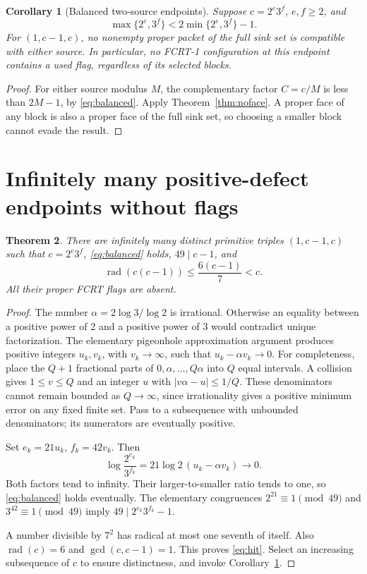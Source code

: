 \documentclass[11pt]{article}
\newtheorem{theorem}{Theorem}[section]
\newtheorem{corollary}[theorem]{Corollary}
\theoremstyle{definition}\newtheorem{definition}[theorem]{Definition}
\theoremstyle{remark}\newtheorem{remark}[theorem]{Remark}
\newcommand{\rad}{\operatorname{rad}}
\begin{document}
\begin{corollary}[Balanced two-source endpoints]\label{cor:balanced}
Suppose \(c=2^e3^f\), \(e,f\ge2\), and
\begin{equation}\label{eq:balanced}
 \max\{2^e,3^f\}<2\min\{2^e,3^f\}-1.
\end{equation}
For \((1,c-1,c)\), no nonempty proper packet of the full sink set is
compatible with either source. In particular, \emph{no} FCRT-1 configuration
at this endpoint contains a used flag, regardless of its selected blocks.
\end{corollary}
\begin{proof}
For either source modulus \(M\), the complementary factor \(C=c/M\)
is less than \(2M-1\), by \eqref{eq:balanced}. Apply
Theorem~\ref{thm:noface}. A proper face of any block is also a proper face
of the full sink set, so choosing a smaller block cannot evade the result.
\end{proof}

\section{Infinitely many positive-defect endpoints without flags}
\begin{theorem}\label{thm:infinite}
There are infinitely many distinct primitive triples \((1,c-1,c)\) such
that \(c=2^e3^f\), \eqref{eq:balanced} holds, \(49\mid c-1\), and
\begin{equation}\label{eq:hit}
 \rad(c(c-1))\le\frac{6(c-1)}7<c.
\end{equation}
All their proper FCRT flags are absent.
\end{theorem}
\begin{proof}
The number \(\alpha=2\log3/\log2\) is irrational. Otherwise an equality
between a positive power of 2 and a positive power of 3 would contradict
unique factorization. The elementary pigeonhole approximation argument
produces positive integers \(u_k,v_k\), with \(v_k\to\infty\), such that
\(u_k-\alpha v_k\to0\). For completeness, place the \(Q+1\) fractional
parts of \(0,\alpha,\ldots,Q\alpha\) into \(Q\) equal intervals. A
collision gives \(1\le v\le Q\) and an integer \(u\) with
\(|v\alpha-u|\le1/Q\). These denominators cannot remain bounded as
\(Q\to\infty\), since irrationality gives a positive minimum error on any
fixed finite set. Pass to a subsequence with unbounded denominators; its
numerators are eventually positive.

Set \(e_k=21u_k\), \(f_k=42v_k\). Then
\[
 \log\frac{2^{e_k}}{3^{f_k}}
       =21\log2\,(u_k-\alpha v_k)\longrightarrow0.
\]
Both factors tend to infinity. Their larger-to-smaller ratio tends to one,
so \eqref{eq:balanced} holds eventually. The elementary congruences
\(2^{21}\equiv1\pmod{49}\) and \(3^{42}\equiv1\pmod{49}\)
imply \(49\mid2^{e_k}3^{f_k}-1\).

A number divisible by \(7^2\) has radical at most one seventh of itself.
Also \(\rad(c)=6\) and \(\gcd(c,c-1)=1\). This proves
\eqref{eq:hit}. Select an increasing subsequence of \(c\) to ensure
distinctness, and invoke Corollary~\ref{cor:balanced}.
\end{proof}
\end{document}
